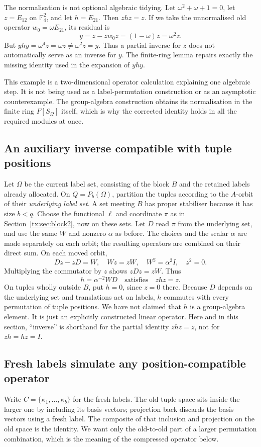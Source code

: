 The normalisation is not optional algebraic tidying. Let
$\omega^2+\omega+1=0$, let $z=E_{12}$ on $\mathbb F_4^2$, and
let $h=E_{21}$. Then $zhz=z$. If we take the unnormalised old
operator $w_0=\omega E_{21}$, its residual is
\[
                   y=z-zw_0z=(1-\omega)z=\omega^2z.
\]
But $yhy=\omega^4z=\omega z\ne\omega^2z=y$. Thus a partial inverse
for $z$ does not automatically serve as an inverse for $y$. The
finite-ring lemma repairs exactly the missing identity used in the
expansion of $yhy$.

This example is a two-dimensional operator calculation explaining
one algebraic step. It is not being used as a label-permutation
construction or as an asymptotic counterexample. The group-algebra
construction obtains its normalisation in the finite ring
$F[S_\Omega]$ itself, which is why the corrected identity holds in
all the required modules at once.

\subsection{An auxiliary inverse compatible with tuple positions}
Let $\Omega$ be the current label set, consisting of the block $B$ and the retained labels already allocated. On $Q=P_b(\Omega)$, partition the tuples according to the $A$-orbit of their \emph{underlying label set}. A set meeting $B$ has proper stabiliser because it has size $b<q$. Choose the functional $\ell$ and coordinate $\pi$ as in Section~\ref{tx:sec:block2}, now on these sets. Let $D$ read $\pi$ from the underlying set, and use the same $W$ and nonzero $\alpha$ as before. The choices and the scalar $\alpha$ are made separately on each orbit; the resulting operators are combined on their direct sum. On each moved orbit,
\[Dz-zD=W,\quad Wz=zW,\quad W^2=\alpha^2I,\quad z^2=0.\]
Multiplying the commutator by $z$ shows $zDz=zW$. Thus
\[h=\alpha^{-2}WD\quad\text{satisfies}\quad zhz=z.\]
On tuples wholly outside $B$, put $h=0$, since $z=0$ there. Because $D$ depends on the underlying set and translations act on labels, $h$ commutes with every permutation of tuple positions. We have not claimed that $h$ is a group-algebra element. It is just an explicitly constructed linear operator.
Here and in this section, ``inverse'' is shorthand for the partial
identity $zhz=z$, not for $zh=hz=I$.

\subsection{Fresh labels simulate any position-compatible operator}
Write $C=\{\kappa_1,\ldots,\kappa_b\}$ for the fresh labels.
The old tuple space sits inside the larger one by including its basis
vectors; projection back discards the basis vectors using a fresh label.
The composite of that inclusion and projection on the old space is
the identity. We want only the old-to-old part of a larger permutation
combination, which is the meaning of the compressed operator below.

